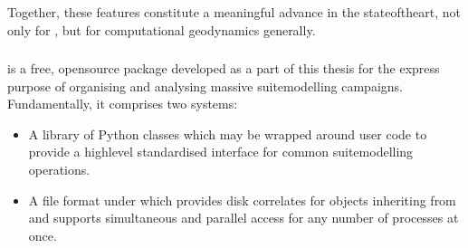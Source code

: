 \documentclass[letterpaper,10pt,english]{jupyterBook}
\begin{document}
\sphinxAtStartPar
Together, these features constitute a meaningful advance in the state\sphinxhyphen{}of\sphinxhyphen{}the\sphinxhyphen{}art, not only for , but for computational geodynamics generally.


\subsubsection{}
\label{\detokenize{content/chapter_02_methods/section3:everest}}
\sphinxAtStartPar
{} is a free, open\sphinxhyphen{}source  package developed as a part of this thesis for the express purpose of organising and analysing massive suite\sphinxhyphen{}modelling campaigns. Fundamentally, it comprises two systems:
\begin{itemize}
\item {} 
\sphinxAtStartPar
A library of Python classes which may be wrapped around user code to provide a high\sphinxhyphen{}level standardised interface for common suite\sphinxhyphen{}modelling operations.

\item {} 
\sphinxAtStartPar
A file format under  which provides disk correlates for objects inheriting from  and supports simultaneous and parallel access for any number of processes at once.

\end{itemize}
\end{document}
